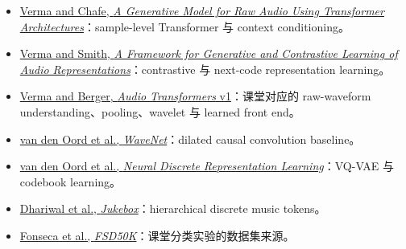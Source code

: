 \documentclass[a4paper]{article}
\begin{document}
\begin{itemize}
  \item \href{https://arxiv.org/abs/2106.16036}{Verma and Chafe, \emph{A Generative Model for Raw Audio Using Transformer Architectures}}：sample-level Transformer 与 context conditioning。
  \item \href{https://arxiv.org/abs/2010.11459}{Verma and Smith, \emph{A Framework for Generative and Contrastive Learning of Audio Representations}}：contrastive 与 next-code representation learning。
  \item \href{https://arxiv.org/abs/2105.00335v1}{Verma and Berger, \emph{Audio Transformers} v1}：课堂对应的 raw-waveform understanding、pooling、wavelet 与 learned front end。
  \item \href{https://arxiv.org/abs/1609.03499}{van den Oord et al., \emph{WaveNet}}：dilated causal convolution baseline。
  \item \href{https://arxiv.org/abs/1711.00937}{van den Oord et al., \emph{Neural Discrete Representation Learning}}：VQ-VAE 与 codebook learning。
  \item \href{https://arxiv.org/abs/2005.00341}{Dhariwal et al., \emph{Jukebox}}：hierarchical discrete music tokens。
  \item \href{https://arxiv.org/abs/2010.00475}{Fonseca et al., \emph{FSD50K}}：课堂分类实验的数据集来源。
\end{itemize}
\end{document}
